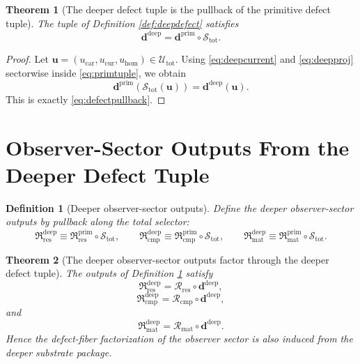 \documentclass[11pt]{article}
\newcommand{\Car}{\mathrm{car}}
\newcommand{\Cur}{\mathrm{cur}}
\newcommand{\Hom}{\mathrm{hom}}
\newcommand{\PrimDefectTuple}{\mathbf d^{\mathrm{prim}}}
\newcommand{\DeepDefectTuple}{\mathbf d^{\mathrm{deep}}}
\newcommand{\PrimResidualSector}{\mathfrak R_{\mathrm{res}}^{\mathrm{prim}}}
\newcommand{\PrimCompletionSector}{\mathfrak R_{\mathrm{cmp}}^{\mathrm{prim}}}
\newcommand{\PrimMatterSector}{\mathfrak R_{\mathrm{mat}}^{\mathrm{prim}}}
\newcommand{\DeepResidualSector}{\mathfrak R_{\mathrm{res}}^{\mathrm{deep}}}
\newcommand{\DeepCompletionSector}{\mathfrak R_{\mathrm{cmp}}^{\mathrm{deep}}}
\newcommand{\DeepMatterSector}{\mathfrak R_{\mathrm{mat}}^{\mathrm{deep}}}
\newcommand{\ResidualRead}{\mathscr R_{\mathrm{res}}}
\newcommand{\CompletionRead}{\mathscr R_{\mathrm{cmp}}}
\newcommand{\MatterRead}{\mathscr R_{\mathrm{mat}}}
\newcommand{\DeepShell}{\mathcal U_{\mathrm{tot}}}
\newcommand{\ChainSelectTriple}{\mathcal S_{\mathrm{tot}}}
\newtheorem{definition}{Definition}
\newtheorem{theorem}{Theorem}
\begin{document}
\begin{theorem}[The deeper defect tuple is the pullback of the primitive defect tuple]
\label{thm:defectpullback}
The tuple of Definition \ref{def:deepdefect} satisfies
\begin{equation}
\DeepDefectTuple
=
\PrimDefectTuple\circ\ChainSelectTriple.
\label{eq:defectpullback}
\end{equation}
\end{theorem}

\begin{proof}
Let \(\mathbf u=(u_{\Car},u_{\Cur},u_{\Hom})\in\DeepShell\). Using \eqref{eq:deepcurrent} and \eqref{eq:deepproj} sectorwise inside \eqref{eq:primtuple}, we obtain
\[
\PrimDefectTuple(\ChainSelectTriple(\mathbf u))
=
\DeepDefectTuple(\mathbf u).
\]
This is exactly \eqref{eq:defectpullback}.
\end{proof}

\section{Observer-Sector Outputs From the Deeper Defect Tuple}

\begin{definition}[Deeper observer-sector outputs]
\label{def:deepoutputs}
Define the deeper observer-sector outputs by pullback along the total selector:
\[
\DeepResidualSector
\equiv
\PrimResidualSector\circ\ChainSelectTriple,
\qquad
\DeepCompletionSector
\equiv
\PrimCompletionSector\circ\ChainSelectTriple,
\qquad
\DeepMatterSector
\equiv
\PrimMatterSector\circ\ChainSelectTriple.
\]
\end{definition}

\begin{theorem}[The deeper observer-sector outputs factor through the deeper defect tuple]
\label{thm:deepsector}
The outputs of Definition \ref{def:deepoutputs} satisfy
\begin{equation}
\DeepResidualSector
=
\ResidualRead\circ\DeepDefectTuple,
\label{eq:deepres}
\end{equation}
\begin{equation}
\DeepCompletionSector
=
\CompletionRead\circ\DeepDefectTuple,
\label{eq:deepcmp}
\end{equation}
and
\begin{equation}
\DeepMatterSector
=
\MatterRead\circ\DeepDefectTuple.
\label{eq:deepmat}
\end{equation}
Hence the defect-fiber factorization of the observer sector is also induced from the deeper substrate package.
\end{theorem}
\end{document}

